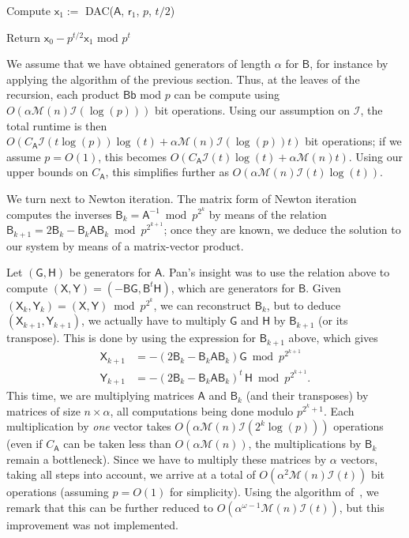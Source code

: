 \documentclass{sig-alternate}
\newcommand{\vb}{\ensuremath{\mathsf{b}}}
\newcommand{\vr}{\ensuremath{\mathsf{r}}}
\newcommand{\vx}{\ensuremath{\mathsf{x}}}
\newcommand{\mA}{\ensuremath{\mathsf{A}}}
\newcommand{\mB}{\ensuremath{\mathsf{B}}}
\newcommand{\mG}{\ensuremath{\mathsf{G}}}
\newcommand{\mH}{\ensuremath{\mathsf{H}}}
\newcommand{\mM}{\ensuremath{\mathsf{M}}}
\newcommand{\mX}{\ensuremath{\mathsf{X}}}
\newcommand{\mY}{\ensuremath{\mathsf{Y}}}
\newcommand{\M}{\ensuremath{\mathscr{M}}}
\begin{document}
 Compute $\vx_1 := $ DAC($\mA$, $\vr_1$, $p$, $t/2$)

 Return $\vx_0 - p^{t/2}  \vx_1$ mod $p^t$

We assume that we have obtained generators of length $\alpha$ for
$\mB$, for instance by applying the algorithm of the previous section.
Thus, at the leaves of the recursion, each product $\mB \vb$ mod $p$
can be compute using $O(\alpha \M(n) \mathscr{I}(\log(p)))$ bit
operations. Using our assumption on $\mathscr{I}$, the total runtime
is then $O(C_\mA \mathscr{I}(t\log(p)) \log(t) +\alpha \M(n)
\mathscr{I}(\log(p)) t)$ bit operations; if we assume $p=O(1)$, this
becomes $O(C_\mA \mathscr{I}(t) \log(t) +\alpha \M(n) t)$.  Using our
upper bounds on $C_\mA$, this simplifies further as $O(\alpha \M(n)
\mathscr{I}(t) \log(t))$.


We turn next to Newton iteration. The matrix form of Newton iteration
computes the inverses $\mB_k=\mA^{-1} \bmod p^{2^k}$ by means of the
relation $\mB_{k+1} = 2\mB_k - \mB_k \mA \mB_k \bmod p^{2^{k+1}}$;
once they are known, we deduce the solution to our system by means
of a matrix-vector product.

Let $(\mG,\mH)$ be generators for $\mA$. Pan's insight was to use the
relation above to compute $(\mX,\mY)=(-\mB \mG,\mB^{t}\mH)$, which are
generators for $\mB$. Given $(\mX_k,\mY_k)=(\mX,\mY) \bmod p^{2^k}$,
we can reconstruct $\mB_k$, but to deduce $(\mX_{k+1},\mY_{k+1})$, we
actually have to multiply $\mG$ and $\mH$ by $\mB_{k+1}$ (or its
transpose). This is done by using the expression for $\mB_{k+1}$ 
above, which gives
\begin{align*}
\mX_{k+1} &= -(2\mB_k - \mB_k \mA \mB_k)\mG \bmod p^{2^{k+1}}\\
\mY_{k+1} &= -(2\mB_k - \mB_k \mA \mB_k)^t\, \mH \bmod p^{2^{k+1}}.
\end{align*}
This time, we are multiplying matrices $\mA$ and $\mB_k$ (and their
transposes) by matrices of size $n \times \alpha$, all computations
being done modulo $p^{2^k+1}$. Each multiplication by {\em one} vector
takes $O(\alpha \M(n) \mathscr{I}(2^k \log(p)))$ operations (even if
$C_\mA$ can be taken less than $O(\alpha \M(n))$, the multiplications
by $\mB_k$ remain a bottleneck). Since we have to multiply these
matrices by $\alpha$ vectors, taking all steps into account, we arrive
at a total of $O(\alpha^2 \M(n) \mathscr{I}(t))$ bit operations
(assuming $p=O(1)$ for simplicity). Using the algorithm
of~\cite{BoJeMoSc16}, we remark that this can be further reduced to
$O(\alpha^{\omega-1} \M(n) \mathscr{I}(t))$, but this improvement was
not implemented.
\end{document}
